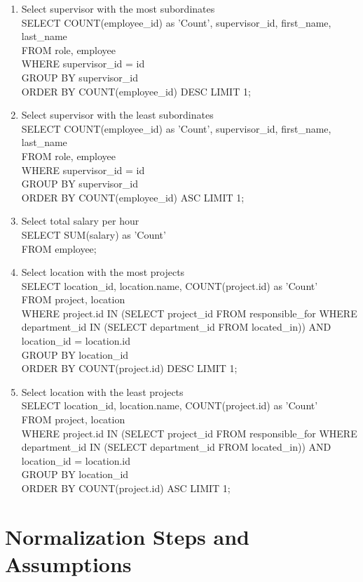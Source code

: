 \documentclass[fleqn, 11pt,letterpaper]{article}
\begin{document}
\begin{enumerate}
		\item Select supervisor with the most subordinates \\SELECT COUNT(employee\_id) as 'Count', supervisor\_id, first\_name, last\_name \\FROM role, employee \\WHERE supervisor\_id = id \\GROUP BY supervisor\_id \\ORDER BY COUNT(employee\_id) DESC LIMIT 1;
		\item Select supervisor with the least subordinates \\SELECT COUNT(employee\_id) as 'Count', supervisor\_id, first\_name, last\_name \\FROM role, employee \\WHERE supervisor\_id = id \\GROUP BY supervisor\_id \\ORDER BY COUNT(employee\_id) ASC LIMIT 1;
		\item Select total salary per hour \\SELECT SUM(salary) as 'Count' \\FROM employee;
		\item Select location with the most projects \\SELECT location\_id, location.name, COUNT(project.id) as 'Count' \\FROM project, location \\WHERE project.id IN (SELECT project\_id FROM responsible\_for WHERE department\_id IN (SELECT department\_id FROM located\_in)) AND location\_id = location.id \\GROUP BY location\_id \\ORDER BY COUNT(project.id) DESC LIMIT 1;
		\item Select location with the least projects \\SELECT location\_id, location.name, COUNT(project.id) as 'Count' \\FROM project, location \\WHERE project.id IN (SELECT project\_id FROM responsible\_for WHERE department\_id IN (SELECT department\_id FROM located\_in)) AND location\_id = location.id \\GROUP BY location\_id \\ORDER BY COUNT(project.id) ASC LIMIT 1;
	\end{enumerate}
	
\pagebreak

\section{Normalization Steps and Assumptions}
\end{document}
